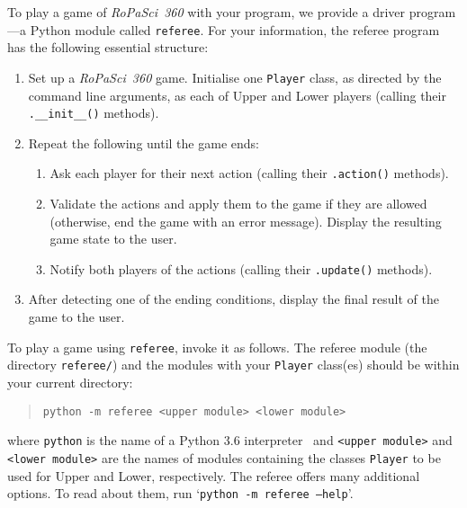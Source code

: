 \documentclass[]{article}
\begin{document}
To play a game of \emph{RoPaSci~360} with your program, we provide a
driver program---a Python module called \texttt{referee}.
%
For your information, the referee program has the following essential
structure:
%
\begin{enumerate}
    \item
        Set up a \emph{RoPaSci~360} game.
        Initialise one \texttt{Player} class, as directed by the command
        line arguments, as each of Upper and Lower players
        (calling their \texttt{.\_\_init\_\_()} methods).
    \item
        Repeat the following until the game ends:
        \begin{enumerate}
            \item
                Ask each player for their next action
                (calling their \texttt{.action()} methods).
            \item
                Validate the actions and apply them to the game if they 
                are allowed
                (otherwise, end the game with an error message).
                Display the resulting game state to the user.
            \item
                Notify both players of the actions
                (calling their \texttt{.update()} methods).
        \end{enumerate}
    \item
        After detecting one of the ending conditions, display the
        final result of the game to the user.
\end{enumerate}

To play a game using \texttt{referee}, invoke it as follows.
%
The referee module (the directory \texttt{referee/}) and the modules with
your \texttt{Player} class(es) should be within your current directory:
%
\begin{quote}
    \texttt{python -m referee <upper module> <lower module>}
\end{quote}
%
where \texttt{python} is the name of a Python 3.6 interpreter\footnotemark
~and \texttt{<upper module>} and \texttt{<lower module>}
are the names of modules containing the classes \texttt{Player} to be used
for Upper and Lower, respectively.
% 
The referee offers many additional options.
To read about them, run `\texttt{python~-m~referee~--help}'.
\end{document}
